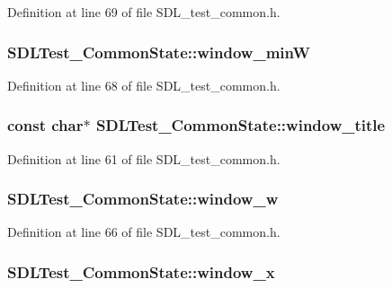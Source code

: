 Definition at line 69 of file S\-D\-L\-\_\-test\-\_\-common.\-h.

\hypertarget{struct_s_d_l_test___common_state_a34b3dccdaec98232fa01274d6842f534}{
\subsubsection[{window\-\_\-min\-W}]{ S\-D\-L\-Test\-\_\-\-Common\-State\-::window\-\_\-min\-W}}\label{struct_s_d_l_test___common_state_a34b3dccdaec98232fa01274d6842f534}


Definition at line 68 of file S\-D\-L\-\_\-test\-\_\-common.\-h.

\hypertarget{struct_s_d_l_test___common_state_a86640ebac0afe0c504c3c324d84dcc37}{
\subsubsection[{window\-\_\-title}]{\setlength{\rightskip}{0pt plus 5cm}const char$\ast$ S\-D\-L\-Test\-\_\-\-Common\-State\-::window\-\_\-title}}\label{struct_s_d_l_test___common_state_a86640ebac0afe0c504c3c324d84dcc37}


Definition at line 61 of file S\-D\-L\-\_\-test\-\_\-common.\-h.

\hypertarget{struct_s_d_l_test___common_state_adc94ae1febd2aa3fa4b190cd0f8cb546}{
\subsubsection[{window\-\_\-w}]{ S\-D\-L\-Test\-\_\-\-Common\-State\-::window\-\_\-w}}\label{struct_s_d_l_test___common_state_adc94ae1febd2aa3fa4b190cd0f8cb546}


Definition at line 66 of file S\-D\-L\-\_\-test\-\_\-common.\-h.

\hypertarget{struct_s_d_l_test___common_state_a5413ab562164642b3e6ee97ab5d938bf}{
\subsubsection[{window\-\_\-x}]{ S\-D\-L\-Test\-\_\-\-Common\-State\-::window\-\_\-x}}\label{struct_s_d_l_test___common_state_a5413ab562164642b3e6ee97ab5d938bf}


